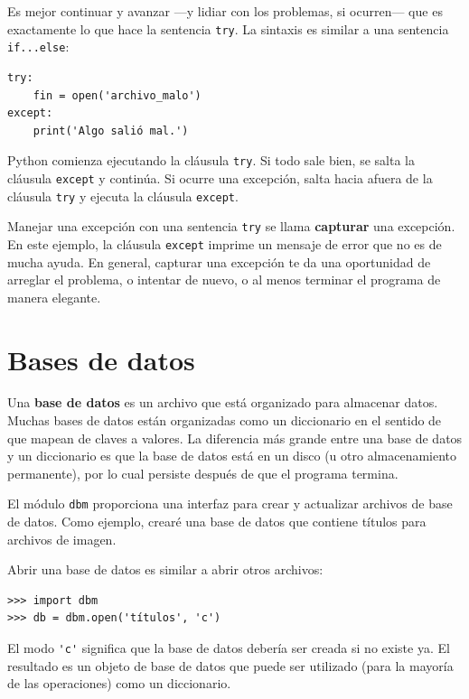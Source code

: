\documentclass[10pt]{book}
\begin{document}
Es mejor continuar y avanzar ---y lidiar con los problemas, si
ocurren--- que es exactamente lo que hace la sentencia {\tt try}.  La
sintaxis es similar a una sentencia {\tt if...else}:

\begin{verbatim}
try:
    fin = open('archivo_malo')
except:
    print('Algo salió mal.')
\end{verbatim}
%
Python comienza ejecutando la cláusula {\tt try}.  Si todo sale
bien, se salta la cláusula {\tt except} y continúa.  Si ocurre
una excepción, salta hacia afuera de la cláusula {\tt try} y
ejecuta la cláusula {\tt except}.

Manejar una excepción con una sentencia {\tt try} se llama {\bf
capturar} una excepción.  En este ejemplo, la cláusula {\tt except}
imprime un mensaje de error que no es de mucha ayuda.  En general,
capturar una excepción te da una oportunidad de arreglar el problema, o intentar
de nuevo, o al menos terminar el programa de manera elegante.


\section{Bases de datos}

Una {\bf base de datos} es un archivo que está organizado para almacenar datos.  Muchas
bases de datos están organizadas como un diccionario en el sentido de que mapean
de claves a valores.  La diferencia más grande entre una base de datos y un
diccionario es que la base de datos está en un disco (u otro almacenamiento
permanente), por lo cual persiste después de que el programa termina.  

El módulo {\tt dbm} proporciona una interfaz para crear
y actualizar archivos de base de datos.
Como ejemplo, crearé una base de datos
que contiene títulos para archivos de imagen.

Abrir una base de datos es similar a abrir otros archivos:

\begin{verbatim}
>>> import dbm
>>> db = dbm.open('títulos', 'c')
\end{verbatim}
%
El modo \verb"'c'" significa que la base de datos debería ser creada si
no existe ya.  El resultado es un objeto de base de datos
que puede ser utilizado (para la mayoría de las operaciones) como un diccionario.
\end{document}
